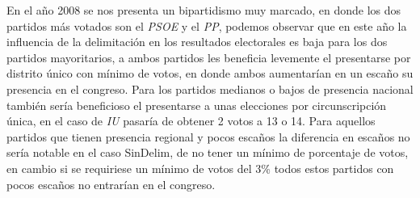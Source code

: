 \documentclass[12pt,a4paper,]{book}
\numberwithin{dummy}{section}
\theoremstyle{ocrenumbox}
\theoremstyle{blacknumex}
\theoremstyle{blacknumbox}
\theoremstyle{ocrenum}
\theoremstyle{ocrenum}
\begin{document}
En el año 2008 se nos presenta un bipartidismo muy marcado, en donde los
dos partidos más votados son el \emph{PSOE} y el \emph{PP}, podemos
observar que en este año la influencia de la delimitación en los
resultados electorales es baja para los dos partidos mayoritarios, a
ambos partidos les beneficia levemente el presentarse por distrito único
con mínimo de votos, en donde ambos aumentarían en un escaño su
presencia en el congreso. Para los partidos medianos o bajos de
presencia nacional también sería beneficioso el presentarse a unas
elecciones por circunscripción única, en el caso de \emph{IU} pasaría de
obtener 2 votos a 13 o 14. Para aquellos partidos que tienen presencia
regional y pocos escaños la diferencia en escaños no sería notable en el
caso SinDelim, de no tener un mínimo de porcentaje de votos, en cambio
si se requiriese un mínimo de votos del 3\% todos estos partidos con
pocos escaños no entrarían en el congreso.

\newpage
\end{document}
